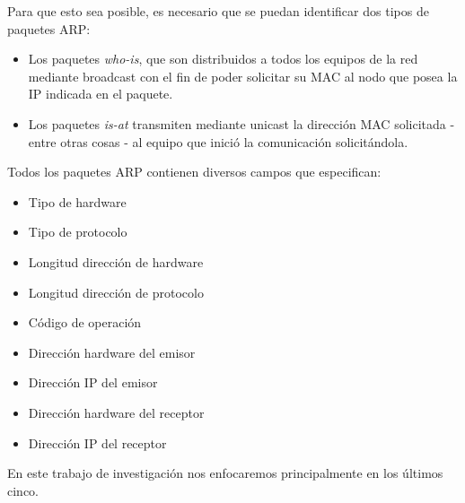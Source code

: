 Para que esto sea posible, es necesario que se puedan identificar dos tipos de paquetes ARP: 

\begin{itemize}
    \item Los paquetes \textit{who-is}, que son distribuidos a todos los equipos de la red mediante broadcast con el fin de poder solicitar su MAC al nodo que posea la IP indicada en el paquete.
    \item Los paquetes \textit{is-at} transmiten mediante unicast la direcci\'on MAC solicitada - entre otras cosas - al equipo que inici\'o la comunicaci\'on solicit\'andola.
\end{itemize}

Todos los paquetes ARP contienen diversos campos que especifican:
\begin{itemize}
    \item Tipo de hardware
    \item Tipo de protocolo
    \item Longitud direcci\'on de hardware
    \item Longitud direcci\'on de protocolo
    \item C\'odigo de operaci\'on
    \item Direcci\'on hardware del emisor
    \item Direcci\'on IP del emisor
    \item Direcci\'on hardware del receptor
    \item Direcci\'on IP del receptor
\end{itemize}

En este trabajo de investigaci\'on nos enfocaremos principalmente en los \'ultimos cinco.
